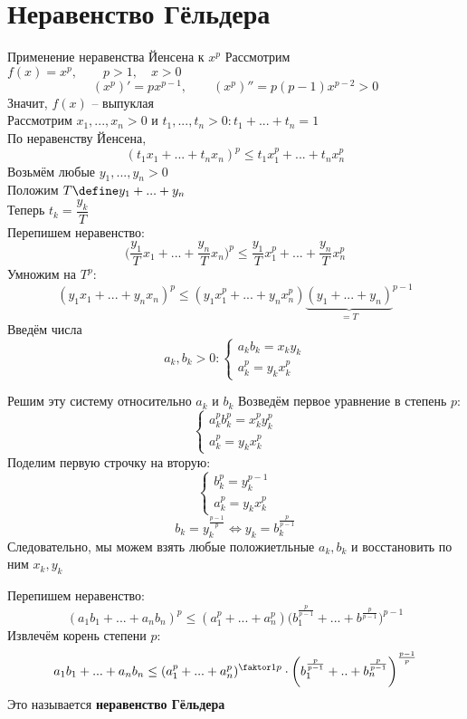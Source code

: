 \section{Неравенство Гёльдера}

\begin{undefthm}{Применение неравенства Йенсена к $ x^p $}
	Рассмотрим $ f(x) = x^p, \qquad p > 1, \quad x > 0 $
    $$ (x^p)' = px^{p - 1}, \qquad (x^p)'' = p(p - 1)x^{p - 2} > 0 $$
    Значит, $ f(x) $ -- выпуклая \\
    Рассмотрим $ x_1, ..., x_n > 0 $ и $ t_1, ..., t_n > 0 : t_1 + ... + t_n = 1 $ \\
    По неравенству Йенсена,
    $$ (t_1x_1 + ... + t_nx_n)^p \le t_1x_1^p + ... + t_nx_n^p $$
    Возьмём любые $ y_1, ..., y_n > 0 $ \\
    Положим $ T \define y_1 + ... + y_n $ \\
    Теперь $ t_k = \dfrac{y_k}T $ \\
    Перепишем неравенство:
    $$ \bigg( \frac{y_1}Tx_1 + ... + \frac{y_n}Tx_n \bigg)^p \le \frac{y_1}Tx_1^p + ... + \frac{y_n}Tx_n^p $$
    Умножим на $ T^p $:
    $$ (y_1x_1 + ... + y_nx_n)^p \le (y_1x_1^p + ... + y_nx_n^p){\underbrace{(y_1 + ... + y_n)}_{= T}}^{p - 1} $$
    Введём числа
    $$ a_k, b_k > 0 :
    \begin{cases}
    	a_kb_k = x_ky_k \\
        a_k^p = y_kx_k^p
    \end{cases} $$
    \begin{undefthm}{Решим эту систему относительно $ a_k $ и $ b_k $}
        Возведём первое уравнение в степень $ p $:
        $$
        \begin{cases}
        	a_k^pb_k^p = x_k^py_k^p \\
            a_k^p = y_kx_k^p
        \end{cases} $$
        Поделим первую строчку на вторую:
        $$
        \begin{cases}
            b_k^p = y_k^{p - 1} \\
            a_k^p = y_kx_k^p
        \end{cases} $$
        $$ b_k = y_k^{\frac{p - 1}p} \iff y_k = b_k^{\frac{p}{p - 1}} $$
        Следовательно, мы можем взять любые положиетльные $ a_k, b_k $ и восстановить по ним $ x_k, y_k $
    \end{undefthm}
    Перепишем неравенство:
    $$ (a_1b_1 + ... + a_nb_n)^p \le (a_1^p + ... + a_n^p) \bigg( b_1^{\frac{p}{p - 1}} + ... + b^{\frac{p}{p - 1}} \bigg)^{p - 1} $$
    Извлечём корень степени $ p $:
    $$ a_1b_1 + ... + a_nb_n \le (a_1^p + ... + a_n^p)^{\faktor1p} \cdot \bigg( b_1^{\frac{p}{p - 1}} + .. + b_n^{\frac{p}{p - 1}} \bigg)^{\frac{p - 1}p} $$
    Это называется \textbf{неравенство Гёльдера}
\end{undefthm}

